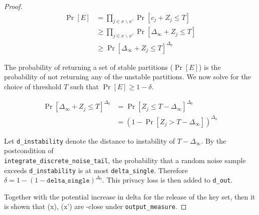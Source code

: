 \documentclass{article}
\begin{document}
\begin{proof}
\begin{align*}
    \Pr[E] &= \prod_{j \in x \backslash x'} \Pr[c_j + Z_j \le T] \\
    &\ge \prod_{j \in x \backslash x'} \Pr[\Delta_\infty + Z_j \le T] \\
    &\ge \Pr[\Delta_\infty + Z_j \le T]^{\Delta_0}
\end{align*}

The probability of returning a set of stable partitions ($\Pr[E]$)
is the probability of not returning any of the unstable partitions.
We now solve for the choice of threshold $T$ such that $\Pr[E] \ge 1 - \delta$.

\begin{align*}
    \Pr[\Delta_\infty + Z_j \le T]^{\Delta_0} &= \Pr[Z_j \le T - \Delta_\infty]^{\Delta_0} \\
    &= (1 - \Pr[Z_j > T - \Delta_\infty])^{\Delta_0}
\end{align*}

Let \texttt{d\_instability} denote the distance to instability of $T - \Delta_\infty$.
By the postcondition of \\ \texttt{integrate\_discrete\_noise\_tail},
the probability that a random noise sample exceeds \texttt{d\_instability} is at most \texttt{delta\_single}.
Therefore $\delta = 1 - (1 - \texttt{delta\_single})^{\Delta_0}$.
This privacy loss is then added to \texttt{d\_out}.

Together with the potential increase in delta for the release of the key set,
then it is shown that \function(x), \function(x') are \dout-close under \texttt{output\_measure}.

\end{proof}



\end{document}
